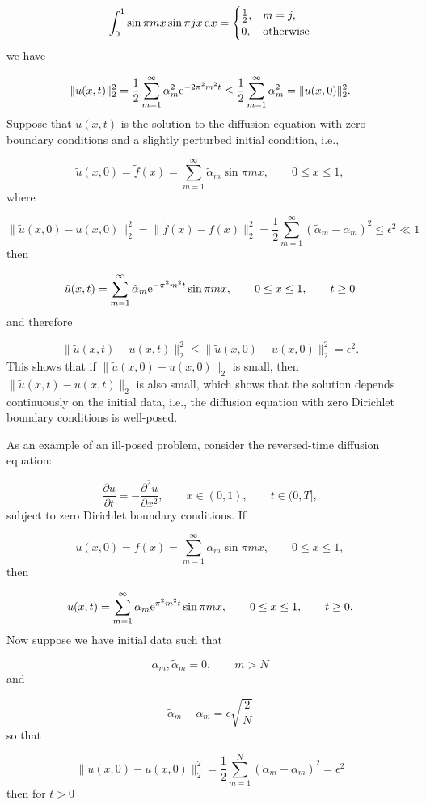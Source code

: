 \documentclass[12pt,a4paper]{article}
\begin{document}
\[
\int_0^1 \sin \pi m x \sin \pi j x\, {\rm d}x = \begin{cases}
\frac{1}{2}, & m  = j, \\
0, & \text{otherwise}
\end{cases}
\]
we have

\[
\|u(x,t)\|_2^2 =  \frac{1}{2}\sum_{m=1}^{\infty} \alpha_m^2 {\rm e}^{-2\pi^2 m^2 t} \leq \frac{1}{2}\sum_{m=1}^{\infty} \alpha_m^2 = \| u(x,0) \|_2^2.
\]
Suppose that $\tilde{u}(x,t)$ is the solution to the diffusion equation with zero boundary conditions and a slightly perturbed initial condition, i.e.,

\[
\tilde{u}(x,0) = \tilde{f}(x) = \sum_{m = 1}^{\infty}\tilde{\alpha}_m \sin \pi m x, \qquad 0 \leq x \leq 1,
\]
where

\[
\| \tilde{u}(x,0) - u(x,0) \|_2^2 = \| \tilde{f}(x) - f(x) \|_2^2 = \frac{1}{2}\sum_{m=1}^{\infty} \left(  \tilde{\alpha}_m -    \alpha_m  \right)^2   \leq \epsilon^2 \ll 1
\]
then

\[
\tilde{u}(x,t) = \sum_{m = 1}^{\infty}\tilde{\alpha}_m {\rm e}^{-\pi^2m^2 t} \sin \pi m x, \qquad 0 \leq x \leq 1, \qquad t \geq 0
\]
and therefore

\[
\|\tilde{u}(x,t) - u(x,t)\|_2^2   \leq  \| \tilde{u}(x,0) -  u(x,0) \|_2^2 = \epsilon^2.
\]
This shows that if $\| \tilde{u}(x,0) -  u(x,0) \|_2$ is small, then $\|\tilde{u}(x,t) - u(x,t)\|_2$ is also small, which shows that the solution depends continuously on the initial data, i.e., the diffusion equation with zero Dirichlet boundary conditions is well-posed.

As an example of an ill-posed problem, consider the reversed-time diffusion equation:

\[
\frac{\partial u}{\partial t}=-\frac{\partial^2 u}{\partial x^2}, \qquad x \in (0, 1),\qquad t \in (0, T],
\]
subject to zero Dirichlet boundary conditions. If

\[
u(x,0) = f(x) = \sum_{m = 1}^{\infty}\alpha_m \sin \pi m x, \qquad 0 \leq x \leq 1,
\]
then

\[
u(x,t) = \sum_{m = 1}^{\infty}\alpha_m {\rm e}^{\pi^2m^2 t} \sin \pi m x, \qquad 0 \leq x \leq 1, \qquad t \geq 0.
\]
Now suppose we have initial data such that

\[
\alpha_m, \tilde{\alpha}_m = 0, \qquad m > N
\]
and

\[
\tilde{\alpha}_m -    \alpha_m  = \epsilon\sqrt{\frac{2}{N}}
\]
so that

\[
\| \tilde{u}(x,0) - u(x,0) \|_2^2 = \frac{1}{2}\sum_{m=1}^{N} \left(  \tilde{\alpha}_m -    \alpha_m  \right)^2     = \epsilon^2
\]
then for $t > 0$
\end{document}
